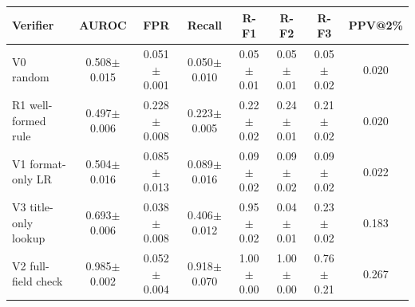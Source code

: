 \begin{tabular}{@{}lccccccc@{}}
\toprule
Verifier & AUROC & FPR & Recall & R-F1 & R-F2 & R-F3 & PPV@2\% \\
\midrule
V0 random & 0.508$\pm$0.015 & 0.051$\pm$0.001 & 0.050$\pm$0.010 & 0.05$\pm$0.01 & 0.05$\pm$0.01 & 0.05$\pm$0.02 & 0.020 \\
R1 well-formed rule & 0.497$\pm$0.006 & 0.228$\pm$0.008 & 0.223$\pm$0.005 & 0.22$\pm$0.02 & 0.24$\pm$0.01 & 0.21$\pm$0.02 & 0.020 \\
V1 format-only LR & 0.504$\pm$0.016 & 0.085$\pm$0.013 & 0.089$\pm$0.016 & 0.09$\pm$0.02 & 0.09$\pm$0.02 & 0.09$\pm$0.02 & 0.022 \\
V3 title-only lookup & 0.693$\pm$0.006 & 0.038$\pm$0.008 & 0.406$\pm$0.012 & 0.95$\pm$0.02 & 0.04$\pm$0.01 & 0.23$\pm$0.02 & 0.183 \\
V2 full-field check & 0.985$\pm$0.002 & 0.052$\pm$0.004 & 0.918$\pm$0.070 & 1.00$\pm$0.00 & 1.00$\pm$0.00 & 0.76$\pm$0.21 & 0.267 \\
\bottomrule
\end{tabular}